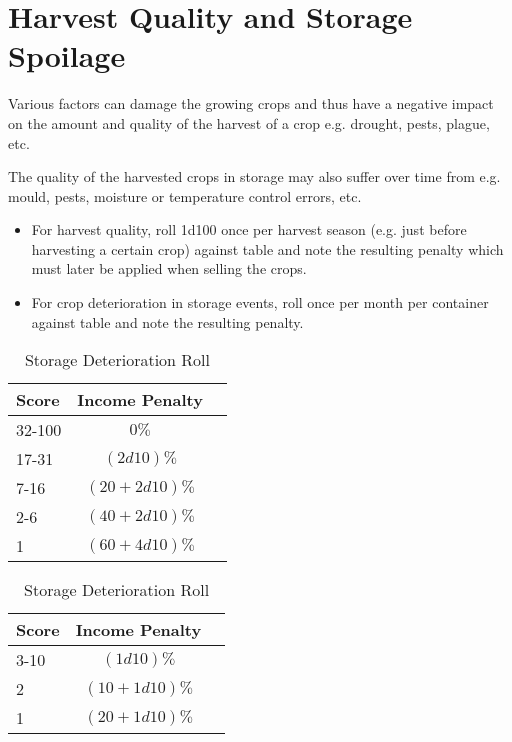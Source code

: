 \documentclass[a4paper,10pt]{article}
\begin{document}
\section{Harvest Quality and Storage Spoilage}
Various factors can damage the growing crops and thus have a negative impact on
the amount and quality of the harvest of a crop e.g. drought, pests, plague,
etc.

The quality of the harvested crops in storage may also suffer over time from
e.g. mould, pests, moisture or temperature control errors, etc.

\begin{itemize}
\item For harvest quality, roll 1d100 once per harvest season (e.g. just before
  harvesting a certain crop) against table
   and note the resulting penalty which
  must later be applied when selling the crops.
\item For crop deterioration in storage events, roll once per month per
  container against table  and note
  the resulting penalty.
\end{itemize}


\begin{table}
\begin{minipage}{0.5\textwidth}
\begin{center}
  \caption{Harvest Quality Roll}
  \begin{tabular}{lcc}
    \toprule
    Score  & Income Penalty \\
    \midrule
    32-100 & $0\%$          \\
    17-31  & $(2d10)\%$     \\
    7-16   & $(20 + 2d10)\%$\\
    2-6    & $(40 + 2d10)\%$\\
    1      & $(60 + 4d10)\%$\\
    \bottomrule
  \end{tabular}
  \label{tab:harvestQualityRolls}
\end{center}
\end{minipage}
%
\begin{minipage}{0.5\textwidth}
\begin{center}
  \caption{Storage Deterioration Roll}
  \begin{tabular}{lcc}
    \toprule
    Score  & Income Penalty \\
    \midrule
    3-10   & $(1d10)\%$\\
    2      & $(10 + 1d10)\%$\\
    1      & $(20 + 1d10)\%$\\
    \bottomrule
  \end{tabular}
  \label{tab:storageDeteriorationRolls}
\end{center}
\end{minipage}
\end{table}
\end{document}
